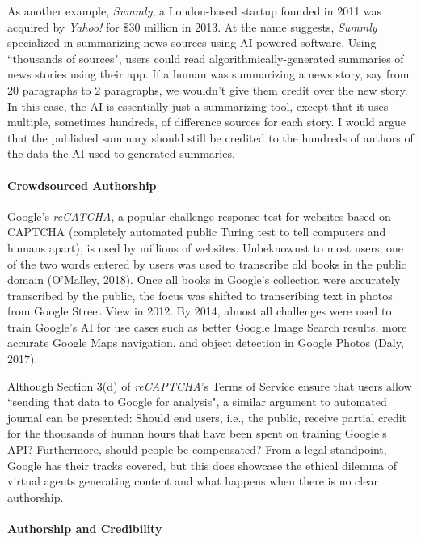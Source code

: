 \documentclass{article}
\begin{document}
As another example, \emph{Summly}, a London-based startup founded in 2011 was acquired by \emph{Yahoo!} for \$30 million in 2013. At the name suggests, \emph{Summly} specialized in summarizing news sources using AI-powered software. Using ``thousands of sources", users could read algorithmically-generated summaries of news stories using their app. If a human was summarizing a news story, say from 20 paragraphs to 2 paragraphs, we wouldn't give them credit over the new story. In this case, the AI is essentially just a summarizing tool, except that it uses multiple, sometimes hundreds, of difference sources for each story. I would argue that the published summary should still be credited to the hundreds of authors of the data the AI used to generated summaries.

\paragraph{Crowdsourced Authorship}

Google's \emph{reCATCHA}, a popular challenge-response test for websites based on CAPTCHA (completely automated public Turing test to tell computers and humans apart), is used by millions of websites. Unbeknownst to most users, one of the two words entered by users was used to transcribe old books in the public domain (O'Malley, 2018). Once all books in Google's collection were accurately transcribed by the public, the focus was shifted to transcribing text in photos from Google Street View in 2012. By 2014, almost all challenges were used to train Google's AI for use cases such as better Google Image Search results, more accurate Google Maps navigation, and object detection in Google Photos (Daly, 2017).

Although Section 3(d) of \emph{reCAPTCHA}'s Terms of Service ensure that users allow ``sending that data to Google for analysis", a similar argument to automated journal can be presented: Should end users, i.e., the public, receive partial credit for the thousands of human hours that have been spent on training Google's API? Furthermore, should people be compensated? From a legal standpoint, Google has their tracks covered, but this does showcase the ethical dilemma of virtual agents generating content and what happens when there is no clear authorship.

\paragraph{Authorship and Credibility}
\end{document}
